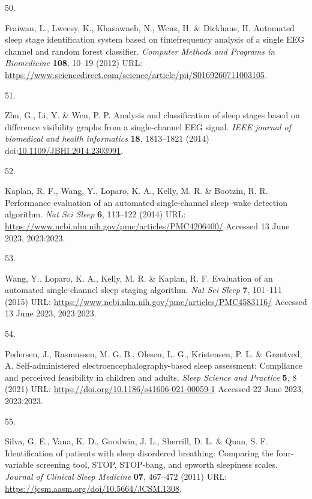 \documentclass[
  10pt,
]{scrbook}
\newlength{\cslhangindent}
\newlength{\csllabelwidth}
\newlength{\cslentryspacingunit} %
\newenvironment{CSLReferences}[2] %
 {%
  \setlength{\parindent}{0pt}
  \ifodd #1
  \let\oldpar\par
  \def\par{\hangindent=\cslhangindent\oldpar}
  \fi
  \setlength{\parskip}{#2\cslentryspacingunit}
 }%
 {}
\newcommand{\CSLLeftMargin}[1]{\parbox[t]{\csllabelwidth}{#1}}
\newcommand{\CSLRightInline}[1]{\parbox[t]{\linewidth - \csllabelwidth}{#1}\break}
\let\originaltextbf\textbf
\renewcommand{\textbf}[1]{\textcolor{color1}{\originaltextbf{#1}}}
\begin{document}
\begin{CSLReferences}{0}{0}
\leavevmode{}%
\CSLLeftMargin{50. }%
\CSLRightInline{Fraiwan, L., Lweesy, K., Khasawneh, N., Wenz, H. \&
Dickhaus, H. Automated sleep stage identification system based on
time{\textendash}frequency analysis of a single EEG channel and random
forest classifier. \emph{Computer Methods and Programs in Biomedicine}
\textbf{108}, 10--19 (2012) URL:
\url{https://www.sciencedirect.com/science/article/pii/S0169260711003105}.}

\leavevmode{}%
\CSLLeftMargin{51. }%
\CSLRightInline{Zhu, G., Li, Y. \& Wen, P. P. Analysis and
classification of sleep stages based on difference visibility graphs
from a single-channel EEG signal. \emph{IEEE journal of biomedical and
health informatics} \textbf{18}, 1813--1821 (2014)
doi:\href{https://doi.org/10.1109/JBHI.2014.2303991}{10.1109/JBHI.2014.2303991}.}

\leavevmode{}%
\CSLLeftMargin{52. }%
\CSLRightInline{Kaplan, R. F., Wang, Y., Loparo, K. A., Kelly, M. R. \&
Bootzin, R. R. Performance evaluation of an automated single-channel
sleep--wake detection algorithm. \emph{Nat Sci Sleep} \textbf{6},
113--122 (2014) URL:
\url{https://www.ncbi.nlm.nih.gov/pmc/articles/PMC4206400/} Accessed 13
June 2023, 2023:2023.}

\leavevmode{}%
\CSLLeftMargin{53. }%
\CSLRightInline{Wang, Y., Loparo, K. A., Kelly, M. R. \& Kaplan, R. F.
Evaluation of an automated single-channel sleep staging algorithm.
\emph{Nat Sci Sleep} \textbf{7}, 101--111 (2015) URL:
\url{https://www.ncbi.nlm.nih.gov/pmc/articles/PMC4583116/} Accessed 13
June 2023, 2023:2023.}

\leavevmode{}%
\CSLLeftMargin{54. }%
\CSLRightInline{Pedersen, J., Rasmussen, M. G. B., Olesen, L. G.,
Kristensen, P. L. \& Grøntved, A. Self-administered
electroencephalography-based sleep assessment: Compliance and perceived
feasibility in children and adults. \emph{Sleep Science and Practice}
\textbf{5}, 8 (2021) URL:
\url{https://doi.org/10.1186/s41606-021-00059-1} Accessed 22 June 2023,
2023:2023.}

\leavevmode{}%
\CSLLeftMargin{55. }%
\CSLRightInline{Silva, G. E., Vana, K. D., Goodwin, J. L., Sherrill, D.
L. \& Quan, S. F. Identification of patients with sleep disordered
breathing: Comparing the four-variable screening tool, STOP, STOP-bang,
and epworth sleepiness scales. \emph{Journal of Clinical Sleep Medicine}
\textbf{07}, 467--472 (2011) URL:
\url{https://jcsm.aasm.org/doi/10.5664/JCSM.1308}.}


\end{CSLReferences}
\end{document}
